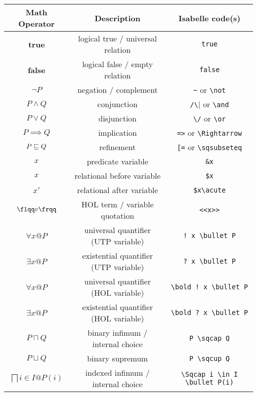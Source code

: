 \documentclass[11pt]{article}
\begin{document}
\begin{center}
\begin{tabular}{|c|c|c|} \hline
  \textbf{Math Operator}      & \textbf{Description}                  & \textbf{Isabelle code(s)} \\ \hline
  \textbf{true}               & logical true / universal relation     & \verb|true| \\
  \textbf{false}              & logical false / empty relation        & \verb|false| \\
  $\neg P$                    & negation / complement                 & \verb|~| or \verb|\not| \\
  $P \land Q$                 & conjunction                           & \verb|/\| or \verb|\and| \\
  $P \lor Q$                  & disjunction                           & \verb|\/| or \verb|\or| \\
  $P \implies Q$              & implication                           & \verb|=>| or \verb|\Rightarrow| \\
  $P \refinedby Q$            & refinement                            & \verb|[=| or \verb|\sqsubseteq| \\
  $x$                         & predicate variable                    & \verb|&x| \\
  $x$                         & relational before variable            & \verb|$x| \\
  $x'$                        & relational after variable             & \verb|$x\acute| \\
  $\flqq v \frqq$             & HOL term / variable quotation         & \verb|<<x>>| \\
  $\forall x @ P$             & universal quantifier (UTP variable)   & \verb|! x \bullet P| \\
  $\exists x @ P$             & existential quantifier (UTP variable) & \verb|? x \bullet P| \\
  $\bm{\forall} x @ P$        & universal quantifier (HOL variable)   & \verb|\bold ! x \bullet P| \\
  $\bm{\exists} x @ P$        & existential quantifier (HOL variable) & \verb|\bold ? x \bullet P| \\
  $P \sqcap Q$                & binary infimum / internal choice      & \verb|P \sqcap Q| \\
  $P \sqcup Q$                & binary supremum                       & \verb|P \sqcup Q| \\
  $\bigsqcap i \in I @ P(i)$  & indexed infimum / internal choice     & \verb|\Sqcap i \in I \bullet P(i)| \\

\end{tabular}
\end{center}
\end{document}

